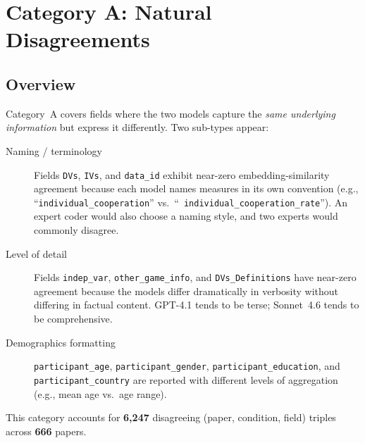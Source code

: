 \documentclass[11pt,a4paper]{article}
\begin{document}
        \section{Category A: Natural Disagreements}

        \subsection{Overview}
        Category~A covers fields where the two models capture the \emph{same
underlying information} but express it differently.  Two sub-types appear:

\begin{description}
  \item[Naming / terminology] Fields \texttt{DVs}, \texttt{IVs}, and
    \texttt{data\_id} exhibit near-zero embedding-similarity agreement
    because each model names measures in its own convention
    (e.g., ``\texttt{individual\_cooperation}'' vs.\ ``\texttt{%
    individual\_cooperation\_rate}'').  An expert coder would also choose
    a naming style, and two experts would commonly disagree.

  \item[Level of detail] Fields \texttt{indep\_var},
    \texttt{other\_game\_info}, and \texttt{DVs\_Definitions} have
    near-zero agreement because the models differ dramatically in verbosity
    without differing in factual content.  GPT-4.1 tends to be terse;
    Sonnet~4.6 tends to be comprehensive.

  \item[Demographics formatting] \texttt{participant\_age},
    \texttt{participant\_gender}, \texttt{participant\_education}, and
    \texttt{participant\_country} are reported with different levels of
    aggregation (e.g., mean age vs.\ age range).
\end{description}


        This category accounts for \textbf{6,247} disagreeing
        (paper, condition, field) triples across \textbf{666} papers.
\end{document}
